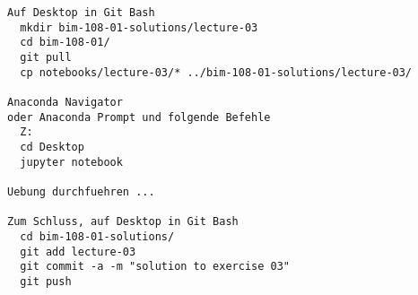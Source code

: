 \documentclass{beamer}
\begin{document}
\begin{frame}[fragile]
  
  \small
  \begin{lstlisting}
Auf Desktop in Git Bash
  mkdir bim-108-01-solutions/lecture-03
  cd bim-108-01/
  git pull
  cp notebooks/lecture-03/* ../bim-108-01-solutions/lecture-03/

Anaconda Navigator 
oder Anaconda Prompt und folgende Befehle
  Z:
  cd Desktop
  jupyter notebook

Uebung durchfuehren ...

Zum Schluss, auf Desktop in Git Bash
  cd bim-108-01-solutions/
  git add lecture-03
  git commit -a -m "solution to exercise 03"
  git push
  \end{lstlisting}
  
\end{frame}
\end{document}
